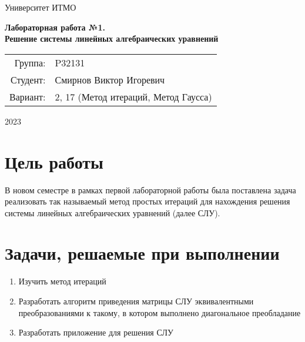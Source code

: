 \documentclass{article}
\begin{document}
\begin{titlepage}
    \begin{center}
        \begin{spacing}{1.4}
            \large{Университет ИТМО} \\
        \end{spacing}
        \vfill
        \textbf{
            \huge{Лабораторная работа №1.} \\
            \huge{Решение системы линейных алгебраических уравнений}
        }
    \end{center}
    \vfill
    \begin{center}
        \begin{tabular}{r l}
            Группа:  & P32131                               \\
            Студент: & Смирнов Виктор Игоревич              \\
            Вариант: & 2, 17 (Метод итераций, Метод Гаусса) \\
        \end{tabular}
    \end{center}
    \vfill
    \begin{center}
        \begin{large}
            2023
        \end{large}
    \end{center}
\end{titlepage}

\section{Цель работы}
В новом семестре в рамках первой лабораторной работы
была поставлена задача реализовать так называемый метод
простых итераций для нахождения решения системы
линейных алгебраических уравнений (далее СЛУ).

\section{Задачи, решаемые при выполнении}
\begin{enumerate}
    \item Изучить метод итераций
    \item Разработать алгоритм приведения матрицы СЛУ
          эквивалентными преобразованиями к такому,
          в котором выполнено диагональное преобладание
    \item Разработать приложение для решения СЛУ
\end{enumerate}
\end{document}
